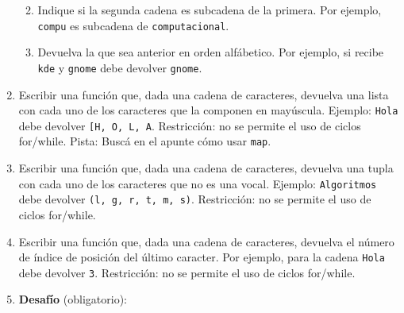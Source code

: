 \documentclass[
  letterpaper,
  DIV=11,
  numbers=noendperiod]{scrreprt}
\providecommand{\tightlist}{%
  \setlength{\itemsep}{0pt}\setlength{\parskip}{0pt}}\usepackage{longtable,booktabs,array}
\begin{document}
\begin{enumerate}
  \begin{enumerate}
  \def\labelenumii{\alph{enumii}.}
  \tightlist
  \item
    Indique si la segunda cadena es subcadena de la primera. Por
    ejemplo, \texttt{\textquotesingle{}compu\textquotesingle{}} es
    subcadena de
    \texttt{\textquotesingle{}computacional\textquotesingle{}}.
  \item
    Devuelva la que sea anterior en orden alfábetico. Por ejemplo, si
    recibe \texttt{\textquotesingle{}kde\textquotesingle{}} y
    \texttt{\textquotesingle{}gnome\textquotesingle{}} debe devolver
    \texttt{\textquotesingle{}gnome\textquotesingle{}}.
  \end{enumerate}
\item
  Escribir una función que, dada una cadena de caracteres, devuelva una
  lista con cada uno de los caracteres que la componen en mayúscula.
  Ejemplo: \texttt{\textquotesingle{}Hola\textquotesingle{}} debe
  devolver
  \texttt{{[}\textquotesingle{}H\textquotesingle{},\ \textquotesingle{}O\textquotesingle{},\ \textquotesingle{}L\textquotesingle{},\ \textquotesingle{}A\textquotesingle{}{]}}.
  Restricción: no se permite el uso de ciclos for/while. Pista: Buscá en
  el apunte cómo usar \texttt{map}.
\item
  Escribir una función que, dada una cadena de caracteres, devuelva una
  tupla con cada uno de los caracteres que no es una vocal. Ejemplo:
  \texttt{\textquotesingle{}Algoritmos\textquotesingle{}} debe devolver
  \texttt{(\textquotesingle{}l\textquotesingle{},\ \textquotesingle{}g\textquotesingle{},\ \textquotesingle{}r\textquotesingle{},\ \textquotesingle{}t\textquotesingle{},\ \textquotesingle{}m\textquotesingle{},\ \textquotesingle{}s\textquotesingle{})}.
  Restricción: no se permite el uso de ciclos for/while.
\item
  Escribir una función que, dada una cadena de caracteres, devuelva el
  número de índice de posición del último caracter. Por ejemplo, para la
  cadena \texttt{\textquotesingle{}Hola\textquotesingle{}} debe devolver
  \texttt{3}. Restricción: no se permite el uso de ciclos for/while.
\item
  \textbf{Desafío} (obligatorio):


\end{enumerate}
\end{document}
